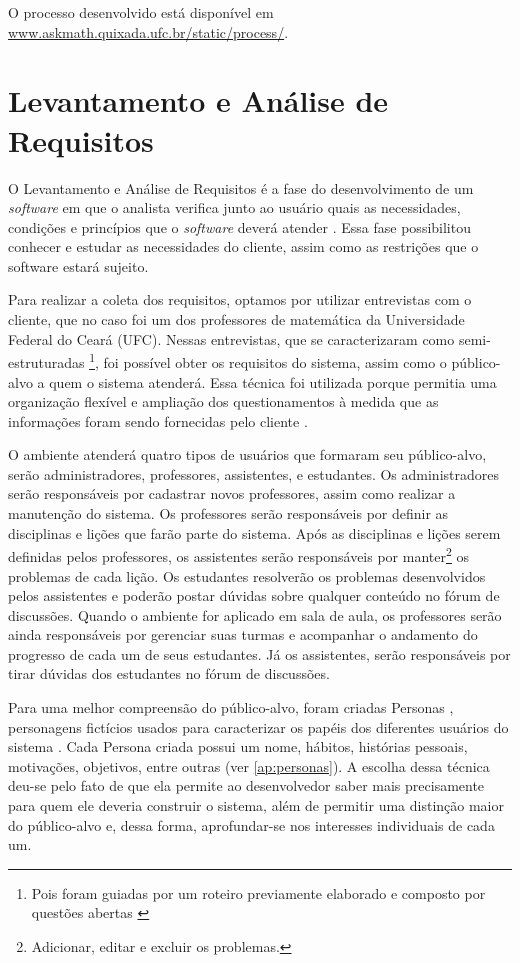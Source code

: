 O processo desenvolvido est\'a dispon\'ivel em \url{www.askmath.quixada.ufc.br/static/process/}. 

\section{Levantamento e Análise de Requisitos}


O Levantamento e An\'alise de Requisitos é a fase do desenvolvimento de um \textit{software} em que o analista verifica junto ao usuário 
quais as necessidades, condições e princípios que o \textit{software} deverá atender \cite{matuda2013mapas}. Essa fase possibilitou 
conhecer e estudar as necessidades do cliente, assim como as restrições que o software estará sujeito.

Para realizar a coleta dos requisitos, optamos por utilizar entrevistas com o cliente, que no caso foi um dos professores de matemática da 
Universidade Federal do Cear\'a (UFC). Nessas entrevistas, que se caracterizaram como semi-estruturadas \footnote{Pois foram guiadas por um 
roteiro previamente elaborado e composto por questões abertas \cite{belei2008uso}}, foi possível obter os requisitos do sistema, assim como 
o público-alvo a quem o sistema atenderá. Essa técnica foi utilizada porque permitia uma organização flexível e ampliação dos 
questionamentos à medida que as informações foram sendo fornecidas pelo cliente \cite{fujisawa2000utilizaccao}.

O ambiente atender\'a quatro tipos de usu\'arios que formaram seu p\'ublico-alvo, ser\~ao administradores, professores, assistentes, e estudantes. Os administradores ser\~ao respons\'aveis por 
cadastrar novos professores, assim como realizar a manuten\c{c}\~ao do sistema. Os professores ser\~ao responsáveis por definir 
as disciplinas e li\c{c}\~oes que far\~ao parte do sistema. 
Ap\'os as disciplinas e li\c{c}\~oes serem definidas pelos professores, os assistentes ser\~ao respons\'aveis por manter\footnote{Adicionar, editar e excluir os problemas.} os problemas de cada 
li\c{c}\~ao. Os estudantes resolver\~ao os problemas desenvolvidos pelos assistentes e poder\~ao postar d\'uvidas sobre qualquer conte\'udo 
no f\'orum de discuss\~oes. Quando o ambiente for aplicado em sala de aula, os professores ser\~ao ainda respons\'aveis por gerenciar suas 
turmas e acompanhar o andamento do progresso de cada um de seus estudantes. J\'a os assistentes, ser\~ao responsáveis por tirar d\'uvidas 
dos estudantes no f\'orum de discuss\~oes.

Para uma melhor compreensão do público-alvo, foram criadas Personas \cite{pruitt2003personas}, personagens fictícios usados para 
caracterizar os papéis dos diferentes usuários do sistema \cite{guerra2010colaboraccao}. Cada Persona criada possui um nome, hábitos, 
histórias pessoais, motivações, objetivos, entre outras (ver \autoref{ap:personas}). A escolha dessa técnica deu-se pelo fato de que ela 
permite ao desenvolvedor saber mais precisamente para 
quem ele deveria construir o sistema, além de permitir uma distinção maior do público-alvo e, dessa forma, aprofundar-se nos interesses individuais de cada um.

